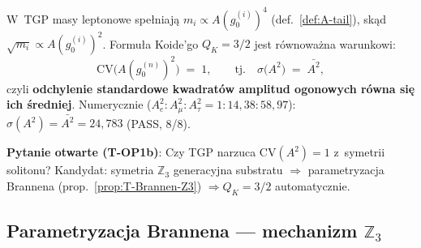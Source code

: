\begin{corollary}[Formulacja TGP: $\mathrm{CV}(A^2)=1$]%
\label{cor:T-CV-Atail}
W~TGP masy leptonowe spe\l{}niaj\k{a} $m_i \propto A(g_0^{(i)})^4$
(def.~\ref{def:A-tail}), sk\k{a}d $\sqrt{m_i} \propto A(g_0^{(i)})^2$.
Formu\l{}a Koide'go $Q_K = 3/2$ jest r\'ownowa\.zna warunkowi:
\begin{equation}\label{eq:T-CV-TGP}
  \mathrm{CV}\!\bigl(A(g_0^{(n)})^2\bigr) \;=\; 1,
  \qquad
  \text{tj.}\quad
  \sigma\!\bigl(A^2\bigr) \;=\; \bar{A^2},
\end{equation}
czyli \textbf{odchylenie standardowe kwadrat\'ow amplitud ogonowych
r\'owna si\k{e} ich \'{s}redniej}.
Numerycznie ($A_e^2:A_\mu^2:A_\tau^2 = 1:14{,}38:58{,}97$):
$\sigma(A^2) = \bar{A^2} = 24{,}783$ (PASS, 8/8).

\textbf{Pytanie otwarte (T-OP1b)}: Czy TGP narzuca
$\mathrm{CV}(A^2)=1$ z~symetrii solitonu?
Kandydat: symetria $\mathbb{Z}_3$ generacyjna substratu
$\Rightarrow$ parametryzacja Brannena (prop.~\ref{prop:T-Brannen-Z3})
$\Rightarrow Q_K = 3/2$ automatycznie.
\end{corollary}

\subsection{Parametryzacja Brannena --- mechanizm $\mathbb{Z}_3$}%
\label{app:T-brannen}

